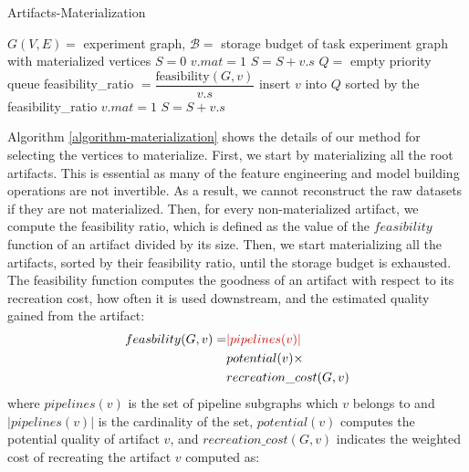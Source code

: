\begin{algorithm}[h]
\caption{Artifacts-Materialization}\label{algorithm-materialization}
\begin{algorithmic}[1]
\Require  $G(V,E)=$ experiment graph, $\mathcal{B}=$ storage budget of task
\Ensure experiment graph with materialized vertices
\State $S= 0$ 
 
		\State $v.mat = 1$
		\State $S = S + v.s$
	\EndIf
\EndFor
\State $Q = $ empty priority queue
		\State feasibility\_ratio $= \dfrac{\text{feasibility}(G, v)}{v.s}$
		\State insert $v$ into $Q$ sorted by the feasibility\_ratio
	\EndIf
\EndFor
{}
		\State $v.mat = 1$
		\State $S = S + v.s$		
	\EndIf
\EndFor
\end{algorithmic}
\end{algorithm}
Algorithm \ref{algorithm-materialization} shows the details of our method for selecting the vertices to materialize.
First, we start by materializing all the root artifacts.
This is essential as many of the feature engineering and model building operations are not invertible.
As a result, we cannot reconstruct the raw datasets if they are not materialized.
Then, for every non-materialized artifact, we compute the feasibility ratio, which is defined as the value of the $feasibility$ function of an artifact divided by its size.
Then, we start materializing all the artifacts, sorted by their feasibility ratio, until the storage budget is exhausted.
The feasibility function computes the goodness of an artifact with respect to its recreation cost, how often it is used downstream, and the estimated quality gained from the artifact:
\begin{equation}
\begin{split}
feasbility(G,v) = 	& \hldel{|pipelines(v)|} \\
								&	potential(v) \times \\
								& recreation\_cost(G,v)  
 \end{split}
\end{equation}
where $pipelines(v)$ is the set of pipeline subgraphs which $v$ belongs to and $|pipelines(v)|$ is the cardinality of the set, $potential(v)$ computes the potential quality of artifact $v$, and $recreation\_cost(G,v)$ indicates the weighted cost of recreating the artifact $v$ computed as:

